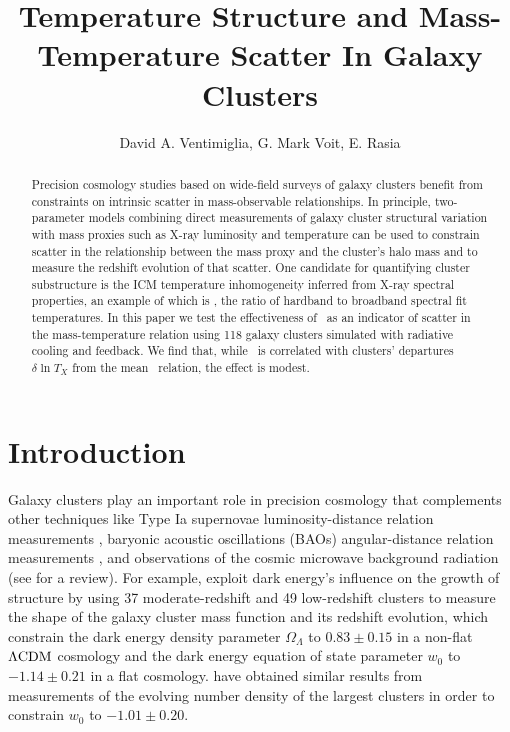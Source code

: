 \documentclass[12pt,preprint]{aastex}
\begin{document}
\title{Temperature Structure and Mass-Temperature Scatter In
  Galaxy Clusters}

\author{
  David A. Ventimiglia,
  G. Mark Voit,
  E. Rasia
}



\begin{abstract}
  Precision cosmology studies based on wide-field surveys of galaxy
  clusters benefit from constraints on intrinsic scatter in
  mass-observable relationships.  In principle, two-parameter models
  combining direct measurements of galaxy cluster structural variation
  with mass proxies such as X-ray luminosity and temperature can be
  used to constrain scatter in the relationship between the mass proxy
  and the cluster's halo mass and to measure the redshift evolution of
  that scatter.  One candidate for quantifying cluster substructure is
  the ICM temperature inhomogeneity inferred from X-ray spectral
  properties, an example of which is \thbr, the ratio of hardband to
  broadband spectral fit temperatures.  In this paper we test the
  effectiveness of \thbr\ as an indicator of scatter in the
  mass-temperature relation using 118 galaxy clusters simulated with
  radiative cooling and feedback.  We find that, while \thbr\ is
  correlated with clusters' departures $\delta \ln T_X$ from the mean
  \mtx\ relation, the effect is modest.
\end{abstract}


\section{Introduction}

Galaxy clusters play an important role in precision cosmology that
complements other techniques like Type Ia supernovae
luminosity-distance relation measurements
\citep{perlmutter_measurements_1999,riess_observational_1998},
baryonic acoustic oscillations (BAOs) angular-distance relation
measurements \citep{eisenstein_detection_2005}, and observations of
the cosmic microwave background radiation (see
\cite{frieman_dark_2008} for a review).  For example,
\cite{vikhlinin_chandra_2009} exploit dark energy's influence on the
growth of structure by using 37 moderate-redshift and 49 low-redshift
clusters to measure the shape of the galaxy cluster mass function and
its redshift evolution, which constrain the dark energy density
parameter $\Omega_{\Lambda}$ to $0.83 \pm 0.15$ in a non-flat
$\Lambda\rm{CDM}$ cosmology and the dark energy equation of state
parameter $w_0$ to $-1.14 \pm 0.21$ in a flat cosmology.
\cite{2010MNRAS.406.1759M} have obtained similar results from
measurements of the evolving number density of the largest clusters in
order to constrain $w_0$ to $-1.01 \pm 0.20$.
\end{document}

